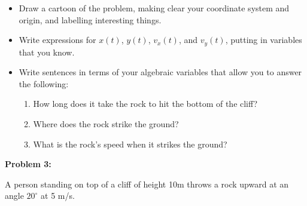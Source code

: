 \documentclass[12pt]{article}
\begin{document}
\begin{itemize}

\item Draw a cartoon of the problem, making clear your coordinate system and origin, and labelling interesting
things.

\vspace{1.2in}

\item Write expressions for $x(t)$, $y(t)$, $v_x(t)$, and $v_y(t)$, putting in variables that you know.

\vspace{1.2in}

\item Write sentences in terms of your algebraic variables that allow you to answer the following:


\begin{enumerate}
\item How long does it take the rock to hit the bottom of the cliff? 
\vspace{0.7in}
\item Where does the rock strike the ground?
\vspace{0.7in}
\item What is the rock's speed when it strikes the ground? 
\end{enumerate}
\end{itemize}

\newpage

{\large \bf Problem 3:}

A person standing on top of a cliff of height 10m throws a rock upward at an angle $20^\circ$ at 5 m/s. 
\end{document}
